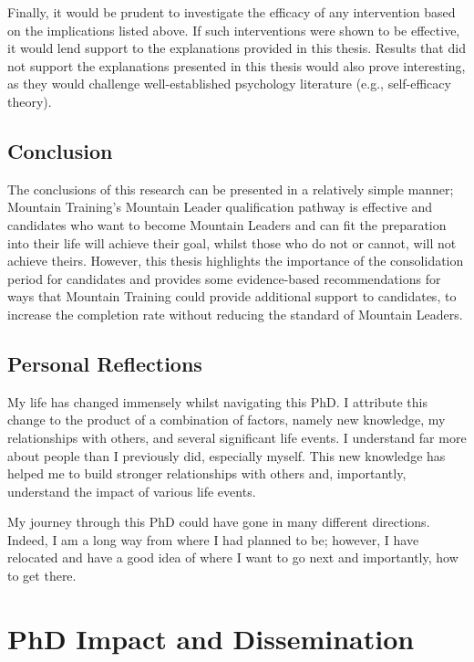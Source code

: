 \documentclass[
  12pt,
  a4paper,
]{book}
\begin{document}
Finally, it would be prudent to investigate the efficacy of any intervention based on the implications listed above. If such interventions were shown to be effective, it would lend support to the explanations provided in this thesis. Results that did not support the explanations presented in this thesis would also prove interesting, as they would challenge well-established psychology literature (e.g., self-efficacy theory).

\hypertarget{general-discussion-conclusion}{%
\section{Conclusion}\label{general-discussion-conclusion}}

The conclusions of this research can be presented in a relatively simple manner; Mountain Training's Mountain Leader qualification pathway is effective and candidates who want to become Mountain Leaders and can fit the preparation into their life will achieve their goal, whilst those who do not or cannot, will not achieve theirs. However, this thesis highlights the importance of the consolidation period for candidates and provides some evidence-based recommendations for ways that Mountain Training could provide additional support to candidates, to increase the completion rate without reducing the standard of Mountain Leaders.

\hypertarget{personal-reflections}{%
\section{Personal Reflections}\label{personal-reflections}}

My life has changed immensely whilst navigating this PhD. I attribute this change to the product of a combination of factors, namely new knowledge, my relationships with others, and several significant life events. I understand far more about people than I previously did, especially myself. This new knowledge has helped me to build stronger relationships with others and, importantly, understand the impact of various life events.

My journey through this PhD could have gone in many different directions. Indeed, I am a long way from where I had planned to be; however, I have relocated and have a good idea of where I want to go next and importantly, how to get there.

\hypertarget{impact-activities}{%
\chapter{PhD Impact and Dissemination}\label{impact-activities}}
\end{document}
